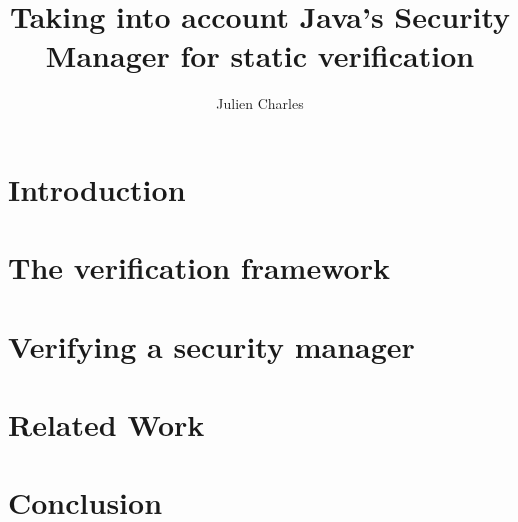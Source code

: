 \documentclass[draft]{llncs}
\begin{document}
\newcommand{\rarrow}{$\rightarrow$}
\newcommand{\conj}{$\wedge$}
\newcommand{\disjonc}{$\vee$}
\newcommand{\s}{\,}
\newcommand{\btab}{\begin{tt}\begin{tabbing}}
\newcommand{\etab}{\end{tabbing}\end{tt}}
\newcommand{\bcode}{\begin{tt}\begin{small}\begin{tabbing}}
\newcommand{\ecode}{\end{tabbing}\end{small}\end{tt}}
%
\frontmatter %
%

\mainmatter %
%
\title{Taking into account Java's Security Manager for static
verification}
%
%
\author{Julien Charles}
%
%
%

\maketitle %

\begin{abstract}

\end{abstract}
%
\section{Introduction}




\section{The verification framework}
\label{framework}



%
\section{Verifying a security manager}
\label{example}


\section{Related Work}
\label{related}

\section{Conclusion}
\label{conclusion}

%
%




%
\end{document}
